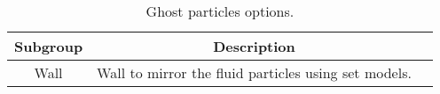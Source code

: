 %
\begin{table}[h!b!p!]\small
	\centering
	\begin{tabular}{| c | c | c | }
		\hline
		\cellcolor[rgb]{0.7,0.7,0.7}Subgroup & \cellcolor[rgb]{0.7,0.7,0.7}Description \\
		\hline
		Wall & Wall to mirror the fluid particles using set models. \\
		\hline
	\end{tabular}
	\caption{Ghost particles options.}
	\label{tables:caseSetup:GhostParticles:Groups}
\end{table}
%
